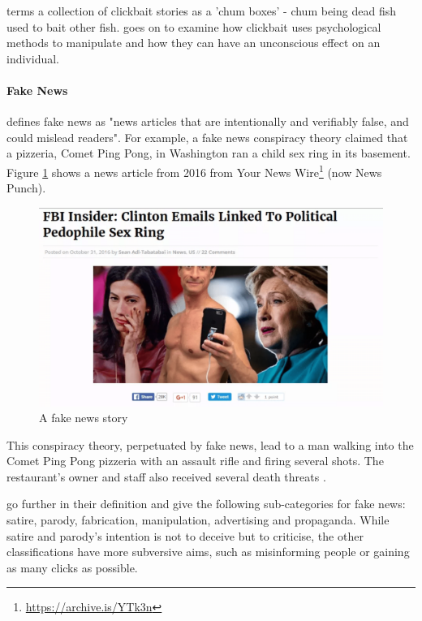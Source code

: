  terms a collection of clickbait stories as a 'chum boxes' - chum being dead fish used to bait other fish. \citeauthor{mahoney2015} goes on to examine how clickbait uses psychological methods to manipulate and how they can have an unconscious effect on an individual.

\paragraph{Fake News}
 defines fake news as "news articles that are intentionally and verifiably false, and could mislead readers". For example, a fake news conspiracy theory claimed that a pizzeria, Comet Ping Pong, in Washington ran a child sex ring in its basement. Figure \ref{fig:fakenews} shows a news article from 2016 from Your News Wire\footnote{\url{https://archive.is/YTk3n}} (now News Punch).


\begin{figure}[ht!]
  \includegraphics[width=\linewidth]{images/fakenews.png}
  \caption{A fake news story}
  \label{fig:fakenews}
\end{figure}


This conspiracy theory, perpetuated by fake news, lead to a man walking into the Comet Ping Pong pizzeria with an assault rifle and firing several shots. The restaurant's owner and staff also received several death threats \cite{lopez2016}.

\citeauthor{allcott2017} go further in their definition and give the following sub-categories for fake news: satire, parody, fabrication, manipulation, advertising and propaganda. While satire and parody's intention is not to deceive but to criticise, the other classifications have more subversive aims, such as misinforming people or gaining as many clicks as possible.

